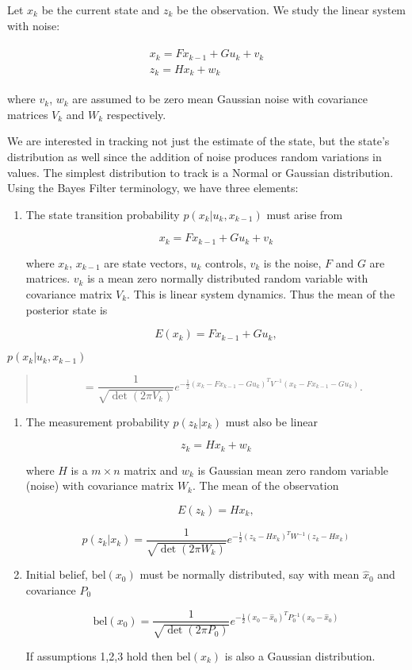 Let \(x_k\) be the current state and \(z_k\) be the observation. We
study the linear system with noise:

\[\begin{aligned}
\begin{array}{l}
x_k = Fx_{k-1} + Gu_k + v_k\\
z_k = Hx_k + w_k
\end{array}
\end{aligned}\]

where \(v_k\), \(w_k\) are assumed to be zero mean Gaussian noise with
covariance matrices \(V_k\) and \(W_k\) respectively.

We are interested in tracking not just the estimate of the state, but
the state's distribution as well since the addition of noise produces
random variations in values. The simplest distribution to track is a
Normal or Gaussian distribution. Using the Bayes Filter terminology, we
have three elements:

\begin{enumerate}
\item
  The state transition probability \(p(x_k|u_k,x_{k-1})\) must arise
  from

  \[x_k = Fx_{k-1}+Gu_k + v_k\]

  where \(x_k\), \(x_{k-1}\) are state vectors, \(u_k\) controls,
  \(v_k\) is the noise, \(F\) and \(G\) are matrices. \(v_k\) is a mean
  zero normally distributed random variable with covariance matrix
  \(V_k\). This is linear system dynamics. Thus the mean of the
  posterior state is

  \[E(x_k) =
  Fx_{k-1}+Gu_k,\]
\end{enumerate}

\(p(x_k|u_k, x_{k-1})\)

\begin{quote}
\[= \frac{1}{\sqrt{\det
    (2\pi V_k)}}e^{-\frac{1}{2}(x_k-Fx_{k-1}-Gu_k)^T V^{-1}(x_k-Fx_{k-1}-Gu_k)}.\]
\end{quote}

\begin{enumerate}
\item
  The measurement probability \(p(z_k|x_k)\) must also be linear

  \[z_k = Hx_k + w_k\]

  where \(H\) is a \(m \times n\) matrix and \(w_k\) is Gaussian mean
  zero random variable (noise) with covariance matrix \(W_k\). The mean
  of the observation

  \[E(z_k) = Hx_k,\]

  \[p(z_k|x_k) = \frac{1}{\sqrt{\det
      (2\pi W_k)}}e^{-\frac{1}{2}(z_k-Hx_k)^T W^{-1}(z_k-Hx_k)}\]
\item
  Initial belief, \(\mbox{bel}(x_0)\) must be normally distributed, say
  with mean \(\hat{x}_0\) and covariance \(P_0\)

  \[\mbox{bel}(x_0) = \frac{1}{\sqrt{\det
      (2\pi P_0)}}e^{-\frac{1}{2}(x_0-\hat{x}_0)^T P_0^{-1}(x_0-\hat{x}_0)}\]

  If assumptions 1,2,3 hold then \(\mbox{bel}(x_k)\) is also a Gaussian
  distribution.
\end{enumerate}

